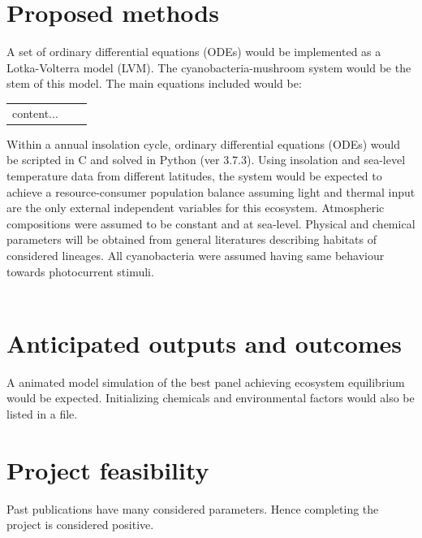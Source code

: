 \documentclass[a4paper, 11pt]{article}
\begin{document}
\section{Proposed methods}
A set of ordinary differential equations (ODEs) would be implemented as a Lotka-Volterra model (LVM).  The cyanobacteria-mushroom system \autocite{joshi2018bacterial} would be the stem of this model.  The main equations included would be:\\
\begin{tabular}{r|rl}
	content...
\end{tabular}
Within a annual insolation cycle, ordinary differential equations (ODEs) would be scripted in C and solved in Python (ver 3.7.3).  Using insolation and sea-level temperature data from different latitudes, the system would be expected to achieve a resource-consumer population balance assuming light and thermal input are the only external independent variables for this ecosystem.  Atmospheric compositions were assumed to be constant and at sea-level.  Physical and chemical parameters will be obtained from general literatures describing habitats of considered lineages.  All cyanobacteria were assumed having same behaviour towards photocurrent stimuli.\\\\

\section{Anticipated outputs and outcomes}
A animated model simulation of the best panel achieving ecosystem equilibrium would be expected.  Initializing chemicals and environmental factors would also be listed in a file.

\section{Project feasibility}
Past publications have many considered parameters.  Hence completing the project is considered positive.
\end{document}
